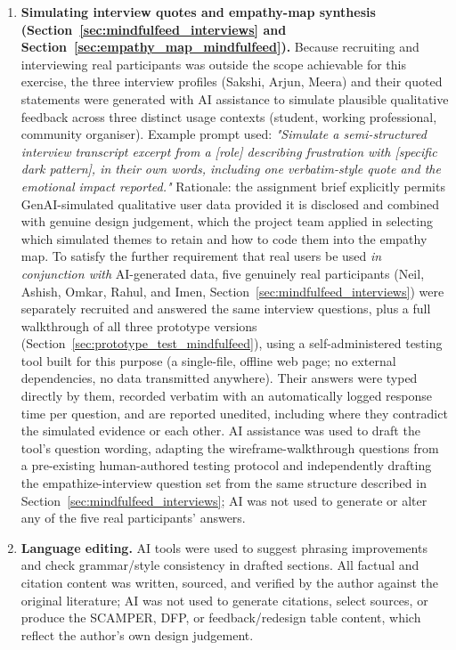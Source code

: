 \documentclass[11pt]{article}
\begin{document}
\begin{enumerate}
\item \textbf{Simulating interview quotes and empathy-map synthesis (Section~\ref{sec:mindfulfeed_interviews} and Section~\ref{sec:empathy_map_mindfulfeed}).} Because recruiting and interviewing real participants was outside the scope achievable for this exercise, the three interview profiles (Sakshi, Arjun, Meera) and their quoted statements were generated with AI assistance to simulate plausible qualitative feedback across three distinct usage contexts (student, working professional, community organiser). Example prompt used: \textit{"Simulate a semi-structured interview transcript excerpt from a [role] describing frustration with [specific dark pattern], in their own words, including one verbatim-style quote and the emotional impact reported."} Rationale: the assignment brief explicitly permits GenAI-simulated qualitative user data provided it is disclosed and combined with genuine design judgement, which the project team applied in selecting which simulated themes to retain and how to code them into the empathy map. To satisfy the further requirement that real users be used \textit{in conjunction with} AI-generated data, five genuinely real participants (Neil, Ashish, Omkar, Rahul, and Imen, Section~\ref{sec:mindfulfeed_interviews}) were separately recruited and answered the same interview questions, plus a full walkthrough of all three prototype versions (Section~\ref{sec:prototype_test_mindfulfeed}), using a self-administered testing tool built for this purpose (a single-file, offline web page; no external dependencies, no data transmitted anywhere). Their answers were typed directly by them, recorded verbatim with an automatically logged response time per question, and are reported unedited, including where they contradict the simulated evidence or each other. AI assistance was used to draft the tool's question wording, adapting the wireframe-walkthrough questions from a pre-existing human-authored testing protocol and independently drafting the empathize-interview question set from the same structure described in Section~\ref{sec:mindfulfeed_interviews}; AI was not used to generate or alter any of the five real participants' answers.
\item \textbf{Language editing.} AI tools were used to suggest phrasing improvements and check grammar/style consistency in drafted sections. All factual and citation content was written, sourced, and verified by the author against the original literature; AI was not used to generate citations, select sources, or produce the SCAMPER, DFP, or feedback/redesign table content, which reflect the author's own design judgement.

\end{enumerate}
\end{document}
